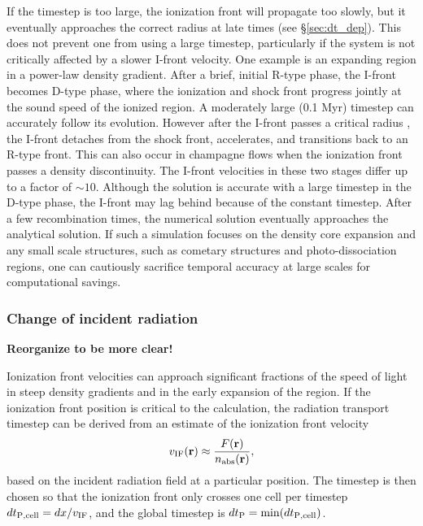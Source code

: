 \documentclass[useAMS,usenatbib]{mn2e}
\begin{document}
If the timestep is too large, the ionization front will propagate too
slowly, but it eventually approaches the correct radius at late times
(see \S\ref{sec:dt_dep}).  This does not prevent one from using a
large timestep, particularly if the system is not critically affected
by a slower I-front velocity.  One example is an expanding \hii
region in a power-law density gradient.  After a brief, initial R-type
phase, the I-front becomes D-type phase, where the ionization and
shock front progress jointly at the sound speed of the ionized region.
A moderately large (0.1 Myr) timestep can accurately follow its
evolution.  However after the I-front passes a critical radius
\citep{Franco90}, the I-front detaches from the shock front,
accelerates, and transitions back to an R-type front.  This can also
occur in champagne flows when the ionization front passes a density
discontinuity.  The I-front velocities in these two stages differ up
to a factor of $\sim10$.  Although the solution is accurate with a
large timestep in the D-type phase, the I-front may lag behind because
of the constant timestep.  After a few recombination times, the
numerical solution eventually approaches the analytical solution.  If
such a simulation focuses on the density core expansion and any small
scale structures, such as cometary structures and photo-dissociation
regions, one can cautiously sacrifice temporal accuracy at large
scales for computational savings.

\subsubsection{Change of incident radiation}
\label{sec:dt_tau}

\textbf{Reorganize to be more clear!}

Ionization front velocities can approach significant fractions of the
speed of light in steep density gradients and in the early expansion
of the \hii region.  If the ionization front position is
critical to the calculation, the radiation transport timestep can be
derived from an estimate of the ionization front velocity
%
\begin{equation}
  \label{eqn:dt_incident}
  v_{\rm IF}(\mathbf{r}) \approx \frac{F(\mathbf{r})}
  {n_{\rm abs}(\mathbf{r})},
\end{equation}
%
based on the incident radiation field at a particular position.  The
timestep is then chosen so that the ionization front only crosses one
cell per timestep $dt_{\rm P, cell} = dx / v_{\rm IF}$, and the global
timestep is $dt_{\rm P} = \min(dt_{\rm P, cell})$.  
\end{document}
